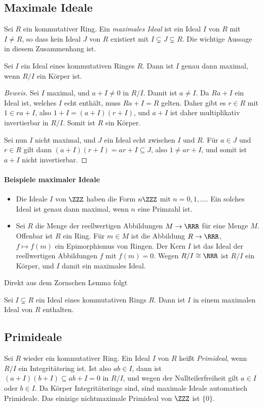 \documentclass[12pt,a4paper,twoside]{article}
\newcommand{\ei}[1]{\emph{#1}\index{#1}}
\begin{document}
\subsection{Maximale Ideale}
Sei $R$ ein kommutativer Ring. Ein \ei{maximales Ideal} ist ein Ideal $I$ von
$R$ mit $I\ne R$, so dass kein Ideal $J$ von $R$ existiert mit $I\subsetneq
J\subsetneq R$. Die wichtige Aussage in diesem Zusammenhang ist.
\begin{Satz}
  Sei $I$ ein Ideal eines kommutativen Ringes $R$. Dann ist $I$ genau dann
  maximal, wenn $R/I$ ein K\"orper ist.
\end{Satz}
\begin{proof}[Beweis]
  Sei $I$ maximal, und $a+I\ne 0$ in $R/I$. Damit ist $a\ne I$. Da $Ra+I$ ein
  Ideal ist, welches $I$ echt enth\"alt, muss $Ra+I=R$ gelten. Daher gibt es
  $r\in R$ mit $1\in ra+I$, also $1+I=(a+I)(r+I)$, und $a+I$ ist daher
  multiplikativ invertierbar in $R/I$. Somit ist $R$ ein K\"orper.

Sei nun $I$ nicht maximal, und $J$ ein Ideal echt zwischen $I$ und $R$. F\"ur
$a\in J$ und $r\in R$ gilt dann $(a+I)(r+I)=ar+I\subseteq J$, also $1\ne
ar+I$, und somit ist $a+I$ nicht invertierbar.
\end{proof}
\paragraph{Beispiele maximaler Ideale}
\begin{itemize}
\item Die Ideale $I$ von $\ZZZ$ haben die Form $n\ZZZ$ mit $n=0,1,\dots$. Ein
  solches Ideal ist genau dann maximal, wenn $n$ eine Primzahl ist.
\item Sei $R$ die Menge der reellwertigen Abbildungen $M\to\RRR$ f\"ur eine
  Menge $M$. Offenbar ist $R$ ein Ring. F\"ur $m\in M$ ist die Abbildung
  $R\to\RRR$, $f\mapsto f(m)$ ein Epimorphismus von Ringen. Der Kern $I$ ist
  das Ideal der reellwertigen Abbildungen $f$ mit $f(m)=0$. Wegen
  $R/I\cong\RRR$ ist $R/I$ ein K\"orper, und $I$ damit ein maximales Ideal.
\end{itemize}
Direkt aus dem Zornschen Lemma folgt
\begin{Satz}[Krull]
  Sei $I\subsetneq R$ ein Ideal eines kommutativen Rings $R$. Dann ist $I$ in
  einem maximalen Ideal von $R$ enthalten.
\end{Satz}
\subsection{Primideale}
Sei $R$ wieder ein kommutativer Ring. Ein Ideal $I$ von $R$ hei\ss t
\ei{Primideal}, wenn $R/I$ ein Integrit\"atsring ist. Ist also $ab\in I$, dann
ist $(a+I)(b+I)\subseteq ab+I=0$ in $R/I$, und wegen der Nullteilerfreiheit
gilt $a\in I$ oder $b\in I$. Da K\"orper Integrit\"atsringe sind, sind
maximale Ideale automatisch Primideale. Das einizige nichtmaximale Primideal
von $\ZZZ$ ist $\{0\}$.
\end{document}
